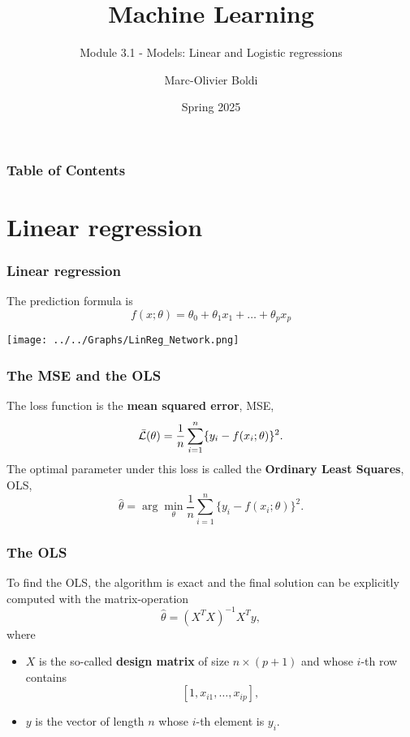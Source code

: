 
\title{Machine Learning}
\subtitle{Module 3.1 - Models: Linear and Logistic regressions}
\author[MOB]{Marc-Olivier Boldi}
\date{Spring 2025}

\begin{frame}
  \titlepage
\end{frame}
\begin{frame}
\frametitle{Table of Contents}
	\tableofcontents
\end{frame}
\section{Linear regression}
\begin{frame}
\frametitle{Linear regression}
The prediction formula is 
$$
f(x;\theta) = \theta_0 + \theta_1 x_{1} + \ldots + \theta_p x_{p}
$$
\begin{center}
\texttt{[image: ../../Graphs/LinReg\_Network.png]}
\end{center}
\end{frame}
\begin{frame}
\frametitle{The MSE and the OLS}
The loss function is the {\bf mean squared error}, MSE,
$$
\bar{\cal L}(\theta) = \frac{1}{n} \sum_{i=1}^n \{y_i - f(x_i;\theta)\}^2.
$$
The optimal parameter under this loss is called the {\bf Ordinary Least Squares}, OLS,
$$
\hat{\theta} = \arg\min_{\theta} \frac{1}{n} \sum_{i=1}^n \{y_i - f(x_i;\theta)\}^2.
$$
\end{frame}
\begin{frame}
\frametitle{The OLS}
To find the OLS, the algorithm is exact and the final solution can be explicitly computed with the matrix-operation
$$
\hat{\theta} = (X^TX)^{-1} X^T y,
$$ 
where
\begin{itemize}
\item $X$ is the so-called {\bf design matrix} of size $n\times (p+1)$ and whose $i$-th row contains 
$$
[1,x_{i1},\ldots,x_{ip}],
$$
\item $y$ is the vector of length $n$ whose $i$-th element is $y_i$.
\end{itemize}
\end{frame}
